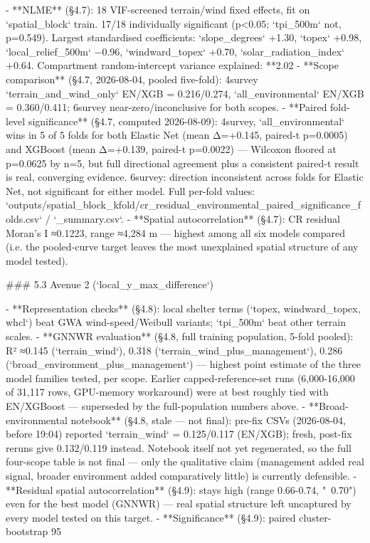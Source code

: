 - **NLME** (§4.7): 18 VIF-screened terrain/wind fixed effects, fit on `spatial_block` train. 17/18 individually significant (p<0.05; `tpi_500m` not, p=0.549). Largest standardised coefficients: `slope_degrees` +1.30, `topex` +0.98, `local_relief_500m` −0.96, `windward_topex` +0.70, `solar_radiation_index` +0.64. Compartment random-intercept variance explained: **2.02%
- **Scope comparison** (§4.7, 2026-08-04, pooled five-fold): 4survey `terrain_and_wind_only` EN/XGB = 0.216/0.274, `all_environmental` EN/XGB = 0.360/0.411; 6survey near-zero/inconclusive for both scopes.
- **Paired fold-level significance** (§4.7, computed 2026-08-09): 4survey, `all_environmental` wins in 5 of 5 folds for both Elastic Net (mean Δ=+0.145, paired-t p=0.0005) and XGBoost (mean Δ=+0.139, paired-t p=0.0022) — Wilcoxon floored at p=0.0625 by n=5, but full directional agreement plus a consistent paired-t result is real, converging evidence. 6survey: direction inconsistent across folds for Elastic Net, not significant for either model. Full per-fold values: `outputs/spatial_block_kfold/cr_residual_environmental_paired_significance_folds.csv` / `_summary.csv`.
- **Spatial autocorrelation** (§4.7): CR residual Moran's I ≈0.1223, range ≈4,284 m — highest among all six models compared (i.e. the pooled-curve target leaves the most unexplained spatial structure of any model tested).

### 5.3 Avenue 2 (`local_y_max_difference`)

- **Representation checks** (§4.8): local shelter terms (`topex, windward_topex, whcl`) beat GWA wind-speed/Weibull variants; `tpi_500m` beat other terrain scales.
- **GNNWR evaluation** (§4.8, full training population, 5-fold pooled): R² ≈0.145 (`terrain_wind`), 0.318 (`terrain_wind_plus_management`), 0.286 (`broad_environment_plus_management`) — highest point estimate of the three model families tested, per scope. Earlier capped-reference-set runs (6,000-16,000 of 31,117 rows, GPU-memory workaround) were at best roughly tied with EN/XGBoost — superseded by the full-population numbers above.
- **Broad-environmental notebook** (§4.8, stale — not final): pre-fix CSVs (2026-08-04, before 19:04) reported `terrain_wind` = 0.125/0.117 (EN/XGB); fresh, post-fix reruns give 0.132/0.119 instead. Notebook itself not yet regenerated, so the full four-scope table is not final — only the qualitative claim (management added real signal, broader environment added comparatively little) is currently defensible.
- **Residual spatial autocorrelation** (§4.9): stays high (range 0.66-0.74, "~0.70") even for the best model (GNNWR) — real spatial structure left uncaptured by every model tested on this target.
- **Significance** (§4.9): paired cluster-bootstrap 95%

